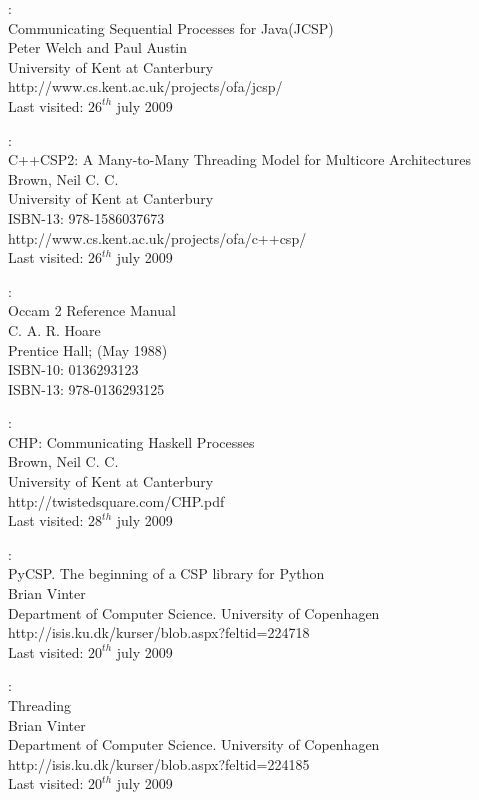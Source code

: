 \documentclass[a4paper,12pt]{article}
\begin{document}
\begin{thebibliography}{99}
:\\
Communicating Sequential Processes for Java\texttrademark (JCSP)\\
Peter Welch and Paul Austin\\
University of Kent at Canterbury\\
http://www.cs.kent.ac.uk/projects/ofa/jcsp/\\
Last visited: $26^{th}$ july 2009

\newpage
{}
:\\
C++CSP2: A Many-to-Many Threading Model for Multicore Architectures\\
Brown,  Neil C. C.\\
University of Kent at Canterbury\\
ISBN-13: 978-1586037673\\
http://www.cs.kent.ac.uk/projects/ofa/c++csp/\\
Last visited: $26^{th}$ july 2009

:\\
Occam 2 Reference Manual\\
C. A. R. Hoare\\
Prentice Hall; (May 1988)\\
ISBN-10: 0136293123\\
ISBN-13: 978-0136293125

:\\
CHP: Communicating Haskell Processes\\
Brown,  Neil C. C.\\
University of Kent at Canterbury\\
http://twistedsquare.com/CHP.pdf\\
Last visited: $28^{th}$ july 2009


:\\
PyCSP. The beginning of a CSP library for Python\\
Brian Vinter\\
Department of Computer Science. University of Copenhagen\\
http://isis.ku.dk/kurser/blob.aspx?feltid=224718\\
Last visited: $20^{th}$ july 2009

:\\
Threading\\
Brian Vinter\\
Department of Computer Science. University of Copenhagen\\
http://isis.ku.dk/kurser/blob.aspx?feltid=224185\\
Last visited: $20^{th}$ july 2009

\end{thebibliography}
\end{document}
